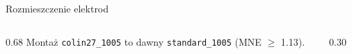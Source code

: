 \begin{frame}{Rozmieszczenie elektrod}
\begin{columns}[T,onlytextwidth]
\begin{column}{0.68\textwidth}
\vspace{6pt}
\vspace{8pt}
{\color{grey}Montaż \texttt{colin27\_1005} to dawny \texttt{standard\_1005} (MNE $\geq$ 1.13).}
\end{column}
\begin{column}{0.30\textwidth}
\centering{}
\end{column}
\end{columns}
\end{frame}

